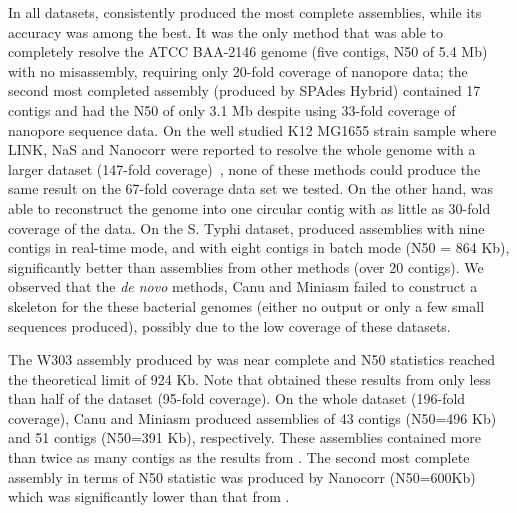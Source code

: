In all datasets, \npscarf{} consistently
produced the most complete assemblies, while its accuracy was among the best.
It was the only method that was able to completely resolve the \kp{} ATCC BAA-2146
genome (five contigs, N50 of 5.4 Mb) with no misassembly, requiring only
20-fold coverage of nanopore data; the second most completed assembly 
(produced by SPAdes Hybrid) contained 17 contigs and had the N50 of 
only 3.1 Mb despite using 33-fold coverage of nanopore sequence data.
On the well studied \ec{} K12 MG1655 strain
sample where LINK, NaS and Nanocorr were reported to resolve the whole genome
with a larger dataset (147-fold coverage)~\cite{WarrenYV2015}, 
none of these methods could produce the same result on the 67-fold coverage data
set we tested. On the other hand, \npscarf{} was able to reconstruct the genome
into one circular contig with as little as 30-fold coverage of the 
data. On the S. Typhi dataset, \npscarf{} produced assemblies with nine contigs
in real-time mode, and with eight contigs in batch mode (N50 = 864 Kb),
significantly better than assemblies from other methods (over 20 contigs).
We observed that the \emph{de novo} methods, Canu and Miniasm failed to
construct a skeleton for the these bacterial genomes (either no output or only 
a few small sequences produced), possibly due to the low coverage of these
datasets.


The \sce{} W303 assembly produced by \npscarf{} was near complete and N50
statistics reached the theoretical limit of 924 Kb. Note that \npscarf{} obtained
these results from only less than half of the dataset (95-fold coverage). On
the whole dataset (196-fold coverage), Canu and Miniasm produced assemblies of
43 contigs (N50=496 Kb) and 51 contigs (N50=391 Kb), respectively. These
assemblies contained more than twice as many contigs as the results from
\npscarf{}. The second most complete assembly in terms of N50 statistic was
produced by Nanocorr (N50=600Kb) which was significantly lower than that from
\npscarf{}.


